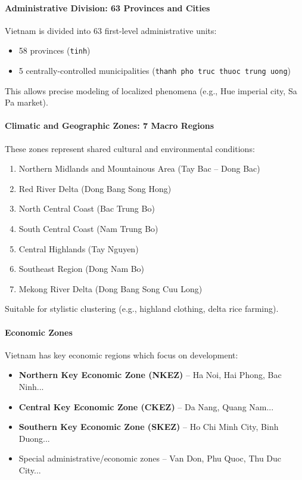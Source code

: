 \documentclass[conference]{IEEEtran}
\begin{document}
\paragraph{Administrative Division: 63 Provinces and Cities}

Vietnam is divided into 63 first-level administrative units:

\begin{itemize}
	\item 58 provinces (\texttt{tinh})
	\item 5 centrally-controlled municipalities (\texttt{thanh pho truc thuoc trung uong})
\end{itemize}

This allows precise modeling of localized phenomena (e.g., Hue imperial city, Sa Pa market).

\paragraph{Climatic and Geographic Zones: 7 Macro Regions}

These zones represent shared cultural and environmental conditions:

\begin{enumerate}
	\item Northern Midlands and Mountainous Area (Tay Bac – Dong Bac)
	\item Red River Delta (Dong Bang Song Hong)
	\item North Central Coast (Bac Trung Bo)
	\item South Central Coast (Nam Trung Bo)
	\item Central Highlands (Tay Nguyen)
	\item Southeast Region (Dong Nam Bo)
	\item Mekong River Delta (Dong Bang Song Cuu Long)
\end{enumerate}

Suitable for stylistic clustering (e.g., highland clothing, delta rice farming).

\paragraph{Economic Zones}

Vietnam has key economic regions which focus on development:

\begin{itemize}
	\item \textbf{Northern Key Economic Zone (NKEZ)} – Ha Noi, Hai Phong, Bac Ninh...
	\item \textbf{Central Key Economic Zone (CKEZ)} – Da Nang, Quang Nam...
	\item \textbf{Southern Key Economic Zone (SKEZ)} – Ho Chi Minh City, Binh Duong...
	\item Special administrative/economic zones – Van Don, Phu Quoc, Thu Duc City...
\end{itemize}
\end{document}
